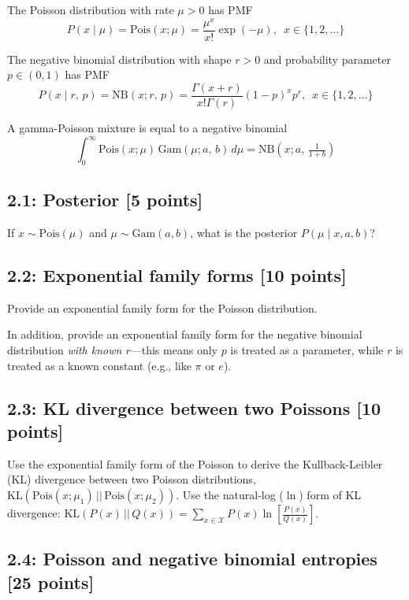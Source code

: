 \documentclass{article}
\begin{document}
The Poisson distribution with rate $\mu>0$ has PMF
\begin{equation}
P(x \mid \mu) = \textrm{Pois}(x; \mu) = \frac{\mu^x}{x!} \exp(-\mu), \,\,\, x \in \{1,2,\dots\}
\end{equation}

The negative binomial distribution with shape $r>0$ and probability parameter $p \in (0,1)$ has PMF
\begin{equation}
P(x \mid r,\, p) = \textrm{NB}(x; r,\, p) = \frac{\Gamma(x+r)}{x! \Gamma(r)} (1-p)^x p^r, \,\,\, x \in \{1,2,\dots\}
\end{equation}

A gamma-Poisson mixture is equal to a negative binomial
\begin{equation}
\int_{0}^\infty \textrm{Pois}(x; \mu) \,\textrm{Gam}(\mu; a,\,b) \,d\mu = \textrm{NB}(x; a,\, \tfrac{1}{1+b})
\end{equation}

\subsection*{2.1: Posterior [5 points]}
If $x \sim \textrm{Pois}(\mu)$ and $\mu \sim \textrm{Gam}(a, b)$, what is the posterior $P(\mu \mid x, a, b)$?

\subsection*{2.2: Exponential family forms [10 points]} 
Provide an exponential family form for the Poisson distribution.

In addition, provide an exponential family form for the negative binomial distribution \textit{with known $r$}---this means only $p$ is treated as a parameter, while $r$ is treated as a known constant (e.g., like $\pi$ or $e$).

\subsection*{2.3: KL divergence between two Poissons [10 points]} Use the exponential family form of the Poisson to derive the Kullback-Leibler (KL) divergence between two Poisson distributions, $\textrm{KL}(\textrm{Pois}(x; \mu_1) \,||\, \textrm{Pois}(x; \mu_2))$. Use the natural-log ($\ln$) form of KL divergence: 
$\textrm{KL}(P(x) \,||\, Q(x)) = \sum_{x \in \mathcal{X}} P(x) \ln\left[\frac{P(x)}{Q(x)}\right]$.

\subsection*{2.4: Poisson and negative binomial entropies [25 points]}
\end{document}
